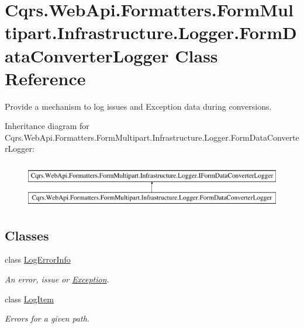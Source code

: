 \hypertarget{classCqrs_1_1WebApi_1_1Formatters_1_1FormMultipart_1_1Infrastructure_1_1Logger_1_1FormDataConverterLogger}{}\section{Cqrs.\+Web\+Api.\+Formatters.\+Form\+Multipart.\+Infrastructure.\+Logger.\+Form\+Data\+Converter\+Logger Class Reference}
\label{classCqrs_1_1WebApi_1_1Formatters_1_1FormMultipart_1_1Infrastructure_1_1Logger_1_1FormDataConverterLogger}


Provide a mechanism to log issues and Exception data during conversions.  


Inheritance diagram for Cqrs.\+Web\+Api.\+Formatters.\+Form\+Multipart.\+Infrastructure.\+Logger.\+Form\+Data\+Converter\+Logger\+:\begin{figure}[H]
\begin{center}
\leavevmode
\includegraphics[height=2.000000cm]{classCqrs_1_1WebApi_1_1Formatters_1_1FormMultipart_1_1Infrastructure_1_1Logger_1_1FormDataConverterLogger}
\end{center}
\end{figure}
\subsection*{Classes}
\begin{DoxyCompactItemize}
\item 
class \hyperlink{classCqrs_1_1WebApi_1_1Formatters_1_1FormMultipart_1_1Infrastructure_1_1Logger_1_1FormDataConverterLogger_1_1LogErrorInfo}{Log\+Error\+Info}
\begin{DoxyCompactList}\small\item\em An error, issue or \hyperlink{classCqrs_1_1WebApi_1_1Formatters_1_1FormMultipart_1_1Infrastructure_1_1Logger_1_1FormDataConverterLogger_1_1LogErrorInfo_aca090100f80122a6a5ae5aa930f49e9b_aca090100f80122a6a5ae5aa930f49e9b}{Exception}. \end{DoxyCompactList}\item 
class \hyperlink{classCqrs_1_1WebApi_1_1Formatters_1_1FormMultipart_1_1Infrastructure_1_1Logger_1_1FormDataConverterLogger_1_1LogItem}{Log\+Item}
\begin{DoxyCompactList}\small\item\em Errors for a given path. \end{DoxyCompactList}\end{DoxyCompactItemize}
